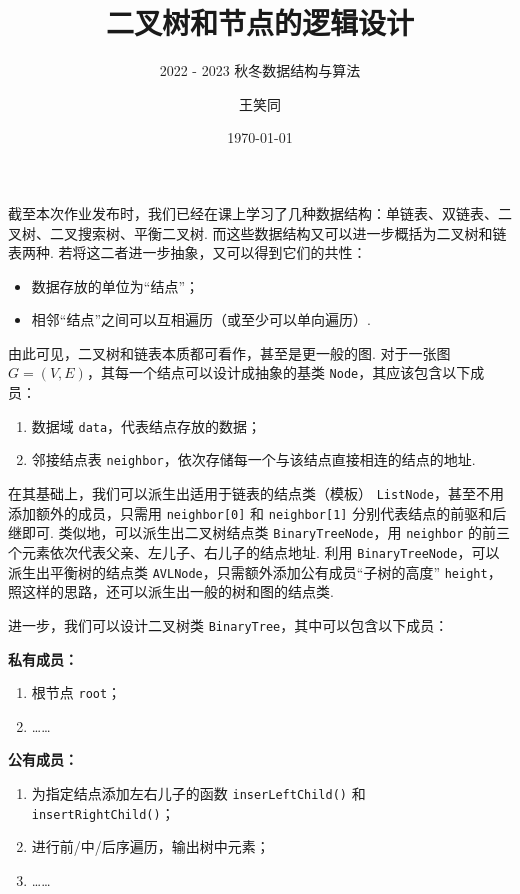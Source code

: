 \documentclass[lang=cn,12pt]{elegantbook}
\title{二叉树和节点的逻辑设计}
\subtitle{2022 - 2023 秋冬\quad 数据结构与算法}
\author{王笑同}
\institute{数学与应用数学（强基计划）2101}
\date{\today}
\begin{document}
\maketitle

\mainmatter

截至本次作业发布时，我们已经在课上学习了几种数据结构：单链表、双链表、二叉树、二叉搜索树、平衡二叉树. 而这些数据结构又可以进一步概括为二叉树和链表两种. 若将这二者进一步抽象，又可以得到它们的共性：
\begin{framed}
  \begin{itemize}
    \item 数据存放的单位为“结点”；
    \item 相邻“结点”之间可以互相遍历（或至少可以单向遍历）.
  \end{itemize}
\end{framed}

由此可见，二叉树和链表本质都可看作，甚至是更一般的图. 对于一张图 $G=(V,E)$，其每一个结点可以设计成抽象的基类 \verb|Node|，其应该包含以下成员：
\begin{framed}
  \begin{enumerate}
    \item 数据域 \verb|data|，代表结点存放的数据；
    \item 邻接结点表 \verb|neighbor|，依次存储每一个与该结点直接相连的结点的地址.
  \end{enumerate}
\end{framed}

在其基础上，我们可以派生出适用于链表的结点类（模板） \verb|ListNode|，甚至不用添加额外的成员，只需用 \verb|neighbor[0]| 和 \verb|neighbor[1]| 分别代表结点的前驱和后继即可. 类似地，可以派生出二叉树结点类 \verb|BinaryTreeNode|，用 \verb|neighbor| 的前三个元素依次代表父亲、左儿子、右儿子的结点地址. 利用 \verb|BinaryTreeNode|，可以派生出平衡树的结点类 \verb|AVLNode|，只需额外添加公有成员“子树的高度” \verb|height|，照这样的思路，还可以派生出一般的树和图的结点类.

进一步，我们可以设计二叉树类 \verb|BinaryTree|，其中可以包含以下成员：

\begin{framed}
  \textbf{私有成员：}

  \begin{enumerate}
    \item 根节点 \verb|root|；
    \item ……
  \end{enumerate}

  \textbf{公有成员：}

  \begin{enumerate}
    \item 为指定结点添加左右儿子的函数 \verb|inserLeftChild()| 和 \verb|insertRightChild()|；
    \item 进行前/中/后序遍历，输出树中元素；
    \item ……
  \end{enumerate}
\end{framed}
\end{document}
